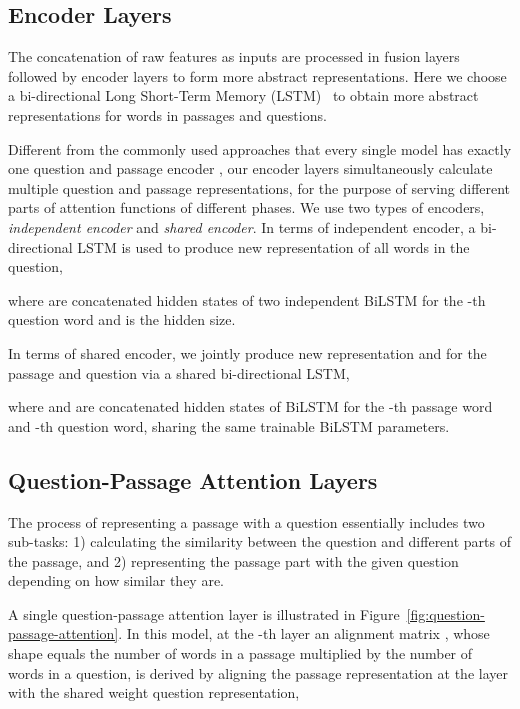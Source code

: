 \documentclass{article} \usepackage{arxiv, times}
\begin{document}
\subsection{Encoder Layers}\label{sec:encoding-layers}
The concatenation of raw features as inputs are processed in fusion layers followed by encoder layers to form more abstract representations. 
Here we choose a bi-directional Long Short-Term Memory (LSTM)~\citep{hochreiter1997long} to obtain more abstract representations for words in passages and questions. 

Different from the commonly used approaches that every single model has exactly one question and passage encoder \citep{seo2016bidirectional, wang2017gated, hureinforced}, our encoder layers simultaneously calculate multiple question and passage representations, for the purpose of serving different parts of attention functions of different phases. We use two types of encoders, \textit{independent encoder} and \textit{shared encoder}. In terms of independent encoder, a bi-directional LSTM is used to produce new representation  of all words in the question,

where  are concatenated hidden states of two independent BiLSTM for the -th question word and  is the hidden size.

In terms of shared encoder, we jointly produce new representation  and  for the passage and question via a shared bi-directional LSTM,

where  and  are concatenated hidden states of BiLSTM for the -th passage word and -th question word, sharing the same trainable BiLSTM parameters.

\subsection{Question-Passage Attention Layers} \label{sec:qp-attention}
The process of representing a passage with a question essentially includes two sub-tasks: 1) calculating the similarity between the question and different parts of the passage, and 2) representing the passage part with the given question depending on how similar they are. 

A single question-passage attention layer is illustrated in Figure~\ref{fig:question-passage-attention}. In this model, at the -th layer an alignment matrix , whose shape equals the number of words  in a passage multiplied by the number of words  in a question, is derived by aligning the passage representation at the  layer with the shared weight question representation,
\end{document}
